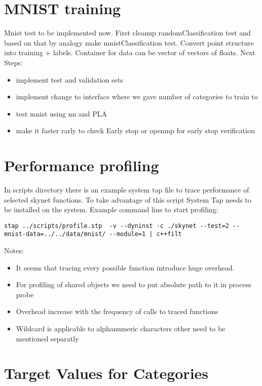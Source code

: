 \documentclass[a4paper,10pt]{article}
\begin{document}
\section{MNIST training}
Mnist test to be implemented now. First cleanup randomClassification test and based on that by analogy make mnistClassification test.
Convert point structure into training + labels. Container for data can be vector of vectors of floats.
Next Steps:
\begin{itemize}
\item implement test and validation sets
\item implement change to interface where we gave number of categories to train to
\item test mnist using nn and PLA
\item make it faster rarly to check Early stop or openmp for early stop verification
\end{itemize}

\section{Performance profiling}
In scripts directory there is an example system tap file to
trace performance of selected skynet functions. To take advantage of this script
System Tap needs to be installed on the system.
Example command line to start profiling:
\begin{verbatim}
stap ../scripts/profile.stp  -v --dyninst -c ./skynet --test=2 --mnist-data=../../data/mnist/ --module=1 | c++filt
\end{verbatim}

Notes:
\begin{itemize}
\item It seems that tracing every possible function introduce huge overhead. 
\item For profiling of shared objects we need to put absolute path to it in process probe
\item Overhead increase with the frequency of calls to traced functions
\item Wildcard is applicable to alphanumeric characters other need to be mentioned separatly
\end{itemize}

\section{Target Values for Categories}
\end{document}
